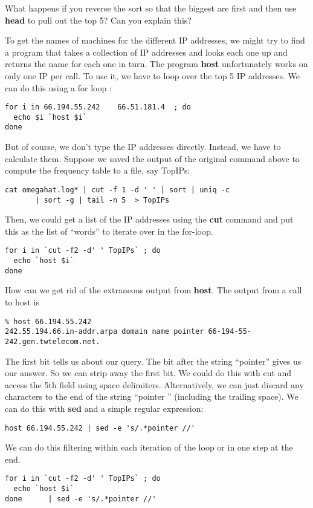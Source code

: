 \documentclass[10pt]{article}
\def\executable#1{\textbf{#1}}
\begin{document}
\begin{enumerate}
What happens if you reverse the sort so that the biggest are first and
then use \executable{head} to pull out the top 5? Can you explain this?

To get the names of machines for the different IP addresses, we might
try to find a program that takes a collection of IP addresses
and looks each one up and returns the name for each one in turn.
The program \executable{host} unfortunately works on only
one IP per call. To use it, we have to loop over the top 5 IP addresses.
We can do this using a for loop :
\begin{verbatim}
for i in 66.194.55.242    66.51.181.4  ; do
  echo $i `host $i`
done
\end{verbatim}
But of course, we don't type the IP addresses directly.
Instead, we have to calculate them.
Suppose we saved the output of the original command above
to compute the frequency table to a file, say TopIPs:
\begin{verbatim}
cat omegahat.log* | cut -f 1 -d ' ' | sort | uniq -c 
       | sort -g | tail -n 5  > TopIPs
\end{verbatim}
Then, we could get a list of the IP addresses using
the \executable{cut} command and put this as the list
of ``words'' to iterate over in the for-loop.
\begin{verbatim}
for i in `cut -f2 -d' ' TopIPs` ; do
  echo `host $i`
done
\end{verbatim}

How can we get rid of the extraneous output from \executable{host}.
The output from a call to host is
\begin{verbatim}
% host 66.194.55.242
242.55.194.66.in-addr.arpa domain name pointer 66-194-55-242.gen.twtelecom.net.
\end{verbatim}
The first bit tells us about our query.
The bit after the string ``pointer''  gives us our answer.
So we can strip away the first bit.
We could do this with cut and access the 5th field using space
delimiters.
Alternatively, we can just discard any characters to the end of 
the string ``pointer '' (including the trailing space).
We can do this with \executable{sed}
and a simple regular expression:
\begin{verbatim}
host 66.194.55.242 | sed -e 's/.*pointer //'
\end{verbatim}


We can do this filtering within each iteration of the
loop or in one step at the end.
\begin{verbatim}
for i in `cut -f2 -d' ' TopIPs` ; do
  echo `host $i`
done      | sed -e 's/.*pointer //' 
\end{verbatim}


\end{enumerate}
\end{document}
